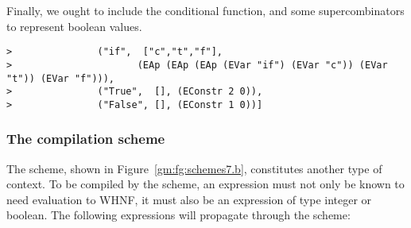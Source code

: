 Finally, we ought to include the conditional function, and some
supercombinators to represent boolean values.
\begin{verbatim}
>               ("if",  ["c","t","f"],
>                      (EAp (EAp (EAp (EVar "if") (EVar "c")) (EVar "t")) (EVar "f"))),
>               ("True",  [], (EConstr 2 0)),
>               ("False", [], (EConstr 1 0))]
\end{verbatim}
\subsubsection{The \tB{} compilation scheme}

The \tB{} scheme, shown in Figure~\ref{gm:fg:schemes7.b}, constitutes
another type of context. To be compiled by the \tB{} scheme, an
expression must not only be known to need evaluation to WHNF, it must
also be an expression of type integer or boolean. The following
expressions will propagate through the \tB{} scheme:
